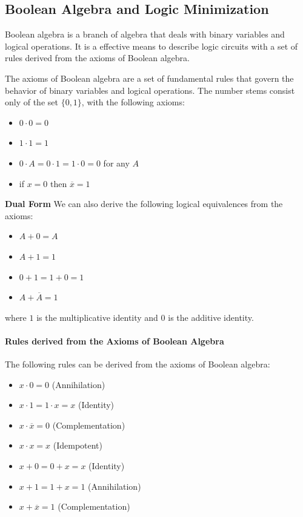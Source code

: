\documentclass[11pt]{report}
\begin{document}
\subsection{Boolean Algebra and Logic Minimization}
\begin{definition}
    Boolean algebra is a branch of algebra that deals with binary variables and logical operations. It is a effective means to describe logic circuits with a set of rules derived from the axioms of Boolean algebra.
\end{definition}

\begin{definition}
    The axioms of Boolean algebra are a set of fundamental rules that govern the behavior of binary variables and logical operations. The number stems consist only of the set $\{0, 1\}$, with the following axioms:
    \begin{itemize}
        \item $0 \cdot 0 = 0$
        \item $1 \cdot 1 = 1$
        \item $0 \cdot A = 0 \cdot 1 = 1 \cdot 0 = 0$ for any $A$
        \item if $x=0$ then $\overline{x} = 1$
    \end{itemize}

    \textbf{Dual Form} We can also derive the following logical equivalences from the axioms:
    \begin{itemize}
        \item $A + 0 = A$
        \item $A + 1 = 1$
        \item $0 + 1 = 1 + 0 = 1$
        \item $A + \overline{A} = 1$
    \end{itemize}

    where $1$ is the multiplicative identity and $0$ is the additive identity.
\end{definition}

\paragraph{Rules derived from the Axioms of Boolean Algebra} The following rules can be derived from the axioms of Boolean algebra:
\begin{theorem}
\begin{itemize}
    \item $x \cdot 0 = 0$ (Annihilation)
    \item $x \cdot 1 = 1 \cdot x = x$ (Identity)
    \item $x \cdot \overline{x} = 0$ (Complementation)
    \item $x \cdot x = x$ (Idempotent)
    \item $x + 0 = 0 + x = x$ (Identity)
    \item $x + 1 = 1 + x = 1$ (Annihilation)
    \item $x + \overline{x} = 1$ (Complementation)
\end{itemize}
\end{theorem}
\end{document}

